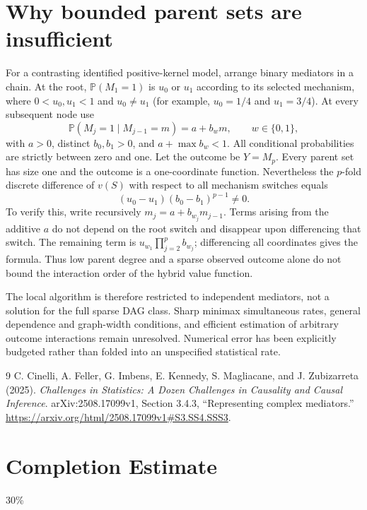 \documentclass[11pt,a4paper]{article}
\theoremstyle{definition}
\theoremstyle{remark}
\newcommand{\Prb}{\mathbb P}
\begin{document}
\section{Why bounded parent sets are insufficient}
For a contrasting identified positive-kernel model, arrange binary mediators in a chain. At the root, $\Prb(M_1=1)$ is $u_0$ or $u_1$ according to its selected mechanism, where $0<u_0,u_1<1$ and $u_0\ne u_1$ (for example, $u_0=1/4$ and $u_1=3/4$). At every subsequent node use
\[
 \Prb(M_j=1\mid M_{j-1}=m)=a+b_wm,
 \qquad w\in\{0,1\},
\]
with $a>0$, distinct $b_0,b_1>0$, and $a+\max b_w<1$. All conditional probabilities are strictly between zero and one. Let the outcome be $Y=M_p$. Every parent set has size one and the outcome is a one-coordinate function. Nevertheless the $p$-fold discrete difference of $v(S)$ with respect to all mechanism switches equals
\[
 (u_0-u_1)(b_0-b_1)^{p-1}\ne0.
\]
To verify this, write recursively $m_j=a+b_{w_j}m_{j-1}$. Terms arising from the additive $a$ do not depend on the root switch and disappear upon differencing that switch. The remaining term is $u_{w_1}\prod_{j=2}^pb_{w_j}$; differencing all coordinates gives the formula. Thus low parent degree and a sparse observed outcome alone do not bound the interaction order of the hybrid value function.

The local algorithm is therefore restricted to independent mediators, not a solution for the full sparse DAG class. Sharp minimax simultaneous rates, general dependence and graph-width conditions, and efficient estimation of arbitrary outcome interactions remain unresolved. Numerical error has been explicitly budgeted rather than folded into an unspecified statistical rate.
\begin{thebibliography}{9}
 C. Cinelli, A. Feller, G. Imbens, E. Kennedy, S. Magliacane, and J. Zubizarreta (2025).
\emph{Challenges in Statistics: A Dozen Challenges in Causality and Causal Inference}. arXiv:2508.17099v1, Section 3.4.3, ``Representing complex mediators.''
\url{https://arxiv.org/html/2508.17099v1#S3.SS4.SSS3}.
\end{thebibliography}

\section{Completion Estimate}
30\%
\end{document}
